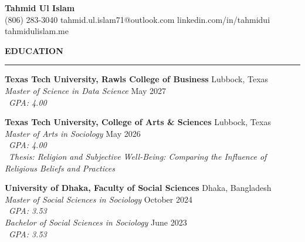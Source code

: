 \documentclass[letterpaper, 11pt]{article}
\begin{document}
    \begin{center}
        {\huge\textbf{Tahmid Ul Islam}} \\
        \vspace{5pt}
        (806) 283-3040
        \textbullet{}
        tahmid.ul.islam71@outlook.com
        \textbullet{} linkedin.com/in/tahmidui
        \textbullet{} tahmidulislam.me
        \\
    \end{center}

    \noindent
    \textbf{\large EDUCATION} \vspace{0.3em} %
    \hrule
    \vspace{0.5em}

    \noindent
    \textbf{Texas Tech University, Rawls College of Business}
    \hfill Lubbock, Texas \\
    \textit{Master of Science in Data Science} \hfill May 2027\\
    \textbullet \ \textit{GPA: 4.00}

    \vspace{0.3em}

    \noindent
    \textbf{Texas Tech University, College of Arts \& Sciences}
    \hfill
    Lubbock, Texas \\
    \textit{Master of Arts in Sociology} \hfill
    May 2026 \\
    \textbullet \ \textit{GPA: 4.00} \\
    \textbullet \ \textit{Thesis: Religion and Subjective Well-Being: Comparing the Influence of Religious Beliefs and Practices}

    \vspace{0.3em}

    \noindent
    \textbf{University of Dhaka, Faculty of Social Sciences}
    \hfill
    Dhaka, Bangladesh \\
    \textit{Master of Social Sciences in Sociology} \hfill
    October 2024 \\
    \textbullet \ \textit{GPA: 3.53}\\
    \textit{Bachelor of Social Sciences in Sociology} \hfill
    June 2023 \\
    \textbullet \ \textit{GPA: 3.53}
    \vspace{0.5em} 
\end{document}
